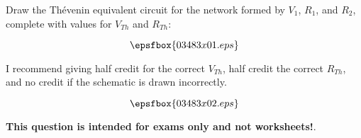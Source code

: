 

Draw the Th\'evenin equivalent circuit for the network formed by $V_1$, $R_1$, and $R_2$, complete with values for $V_{Th}$ and $R_{Th}$:

$$\epsfbox{03483x01.eps}$$

\vskip 40pt







I recommend giving half credit for the correct $V_{Th}$, half credit the correct $R_{Th}$, and no credit if the schematic is drawn incorrectly.

$$\epsfbox{03483x02.eps}$$







{\bf This question is intended for exams only and not worksheets!}.



